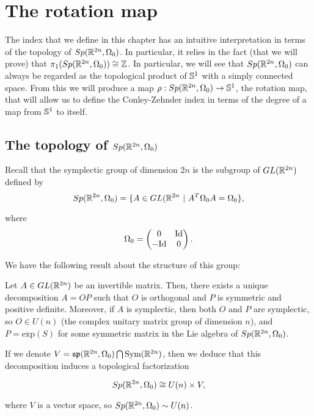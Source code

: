 \section{The rotation map}

The index that we define in this chapter has an intuitive interpretation in terms of the topology of $Sp(\mathbb{R}^{2n},\Omega_0)$. In particular, it relies in the fact (that we will prove) that $\pi_1(Sp(\mathbb{R}^{2n},\Omega_0)) \cong \mathbb{Z}$. In particular, we will see that $Sp(\mathbb{R}^{2n},\Omega_0)$ can always be regarded as the topological product of $\mathbb{S}^1$ with a simply connected space. From this we will produce a map $\rho : Sp(\mathbb{R}^{2n},\Omega_0) \rightarrow \mathbb{S}^1$, the rotation map, that will allow us to define the Conley-Zehnder index in terms of the degree of a map from $\mathbb{S}^1$ to itself.

\subsection{The topology of $Sp(\mathbb{R}^{2n},\Omega_0)$}

Recall that the symplectic group of dimension $2n$ is the subgroup of $GL(\mathbb{R}^{2n})$ defined by
\[Sp(\mathbb{R}^{2n}, \Omega_0) = \{A \in GL(\mathbb{R}^{2n} \ | \ A^T \Omega_0 A = \Omega_0\} ,\]

where
\[\Omega_0 = \begin{pmatrix} 0 & \text{Id} \\ - \text{Id} & 0 \end{pmatrix} .\]

We have the following result about the structure of this group:

\begin{theo} Let $A \in GL(\mathbb{R}^{2n})$ be an invertible matrix. Then, there exists a unique decomposition $A = OP$ such that $O$ is orthogonal and $P$ is symmetric and positive definite. Moreover, if $A$ is symplectic, then both $O$ and $P$ are symplectic, so $O \in U(n)$ (the complex unitary matrix group of dimension $n$), and $P = \text{exp}(S)$ for some symmetric matrix in the Lie algebra of $Sp(\mathbb{R}^{2n},\Omega_0)$.

If we denote $V = \mathfrak{sp}(\mathbb{R}^{2n},\Omega_0) \bigcap \text{Sym}(\mathbb{R}^{2n})$, then we deduce that this decomposition induces a topological factorization

\[Sp(\mathbb{R}^{2n}, \Omega_0) \cong U(n) \times V ,\]

where $V$ is a vector space, so $Sp(\mathbb{R}^{2n},\Omega_0) \sim U(n)$.
\end{theo}